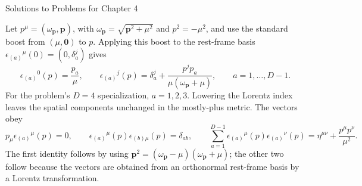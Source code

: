 \begin{bankssolutions}{Solutions to Problems for Chapter 4}

Let $p^\mu=(\omega_{\mathbf p},\mathbf p)$, with
$\omega_{\mathbf p}=\sqrt{\mathbf p^2+\mu^2}$ and $p^2=-\mu^2$, and use the standard
boost from $(\mu,\mathbf0)$ to $p$.  Applying this boost to the rest-frame basis
$\epsilon_{(a)}{}^\mu(0)=(0,\delta_a^j)$ gives
\begin{equation*}
 \epsilon_{(a)}{}^0(p)=\frac{p_a}{\mu},
 \qquad
 \epsilon_{(a)}{}^j(p)=\delta_a^j+
 \frac{p^j p_a}{\mu(\omega_{\mathbf p}+\mu)},
 \qquad a=1,\ldots,D-1.
\end{equation*}
For the problem's $D=4$ specialization, $a=1,2,3$.  Lowering the Lorentz index
leaves the spatial components unchanged in the mostly-plus metric.  The
vectors obey
\begin{equation*}
 p_\mu\epsilon_{(a)}{}^\mu(p)=0,
 \qquad
 \epsilon_{(a)}{}^\mu(p)\epsilon_{(b)\mu}(p)=\delta_{ab},
 \qquad
 \sum_{a=1}^{D-1}\epsilon_{(a)}{}^\mu(p)\epsilon_{(a)}{}^\nu(p)
 =\eta^{\mu\nu}+\frac{p^\mu p^\nu}{\mu^2}.
\end{equation*}
The first identity follows by using
$\mathbf p^2=(\omega_{\mathbf p}-\mu)(\omega_{\mathbf p}+\mu)$;
the other two follow because the vectors are obtained from an orthonormal
rest-frame basis by a Lorentz transformation.


\end{bankssolutions}
